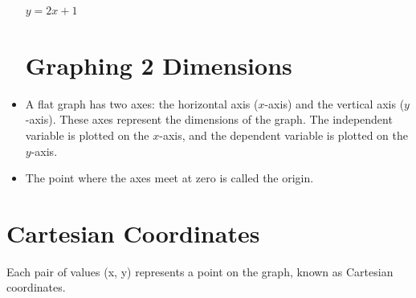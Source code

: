 \documentclass[12pt]{article}
\begin{document}
\begin{itemize}
\vspace{24pt}

\begin{center}
\par\vspace{1em}
\Large{$y=2x+1$}
\end{center}

\newpage

\section*{Graphing 2 Dimensions}
\item A flat graph has two axes: the horizontal axis ($x$-axis) and the vertical axis ($y$-axis). These axes represent the dimensions of the graph. The independent variable is plotted on the $x$-axis, and the dependent variable is plotted on the $y$-axis.
\item The point where the axes meet at zero is called the origin.
\end{itemize}

\vspace{24pt}

\begin{center}
\end{center}

\newpage

\section*{Cartesian Coordinates}

Each pair of values (x, y) represents a point on the graph, known as Cartesian coordinates.
\end{document}
